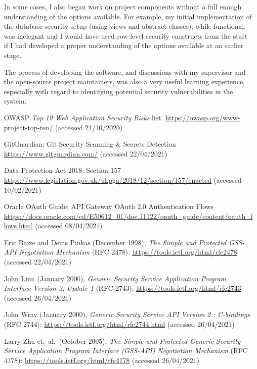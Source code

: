\documentclass[12pt]{report}
\begin{document}
In some cases, I also began work on project components without a full enough understanding of the options available. For example, my initial implementation of the database security setup (using views and abstract classes), while functional, was inelegant and I would have used row-level security constructs from the start if I had developed a proper understanding of the options available at an earlier stage.

The process of developing the software, and discussions with my supervisor and the open-source project maintainers, was also a very useful learning experience, especially with regard to identifying potential security vulnerabilities in the system.


\begin{thebibliography}{99}
 OWASP \textit{Top 10 Web Application Security Risks} list. \url{https://owasp.org/www-project-top-ten/} (accessed 21/10/2020)

 GitGuardian: Git Security Scanning \& Secrets Detection \url{https://www.gitguardian.com/} (accessed 22/04/2021)

 Data Protection Act 2018: Section 157 \url{https://www.legislation.gov.uk/ukpga/2018/12/section/157/enacted} (accessed 10/02/2021)

 Oracle OAuth Guide: API Gateway OAuth 2.0 Authentication Flows \url{https://docs.oracle.com/cd/E50612_01/doc.11122/oauth_guide/content/oauth_flows.html} (accessed 08/04/2021)

 Eric Baize and Denis Pinkas (December 1998), \textit{The Simple and Protected GSS-API Negotiation Mechanism} (RFC 2478): \url{https://tools.ietf.org/html/rfc2478} (accessed 22/04/2021)

 John Linn (January 2000), \textit{Generic Security Service Application Program Interface Version 2, Update 1} (RFC 2743): \url{https://tools.ietf.org/html/rfc2743} (accessed 26/04/2021)

 John Wray (January 2000), \textit{Generic Security Service API Version 2 : C-bindings} (RFC 2744): \url{https://tools.ietf.org/html/rfc2744.html} (accessed 26/04/2021)

 Larry Zhu et.\ al.\ (October 2005), \textit{The Simple and Protected Generic Security Service Application Program Interface (GSS-API) Negotiation Mechanism} (RFC 4178): \url{https://tools.ietf.org/html/rfc4178} (accessed 26/04/2021)


\end{thebibliography}
\end{document}
